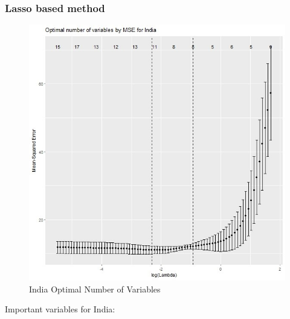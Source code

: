 \documentclass[12pt,a4paper,english]{article}
\begin{document}
\subsubsection{Lasso based method}


\FloatBarrier
\begin{figure}[!htb]
\begin{center}
\includegraphics[scale=0.50]{L1.jpg}
\caption{India Optimal Number of Variables}
\label{figure9}
\end{center}
\end{figure}
\FloatBarrier

Important variables for India:
\end{document}
